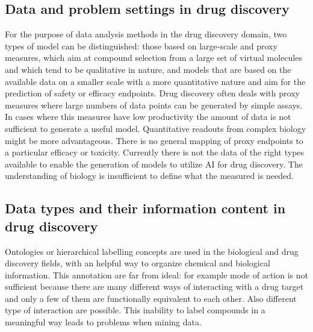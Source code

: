 	\subsection{Data and problem settings in drug discovery}
	For the purpose of data analysis methods in the drug discovery domain, two types of model can be distinguished: those based on large-scale and proxy measures, which aim at compound selection from a large set of virtual molecules and which tend to be qualitative in nature, and models that are based on the available data on a smaller scale with a more quantitative nature and aim for the prediction of safety or efficacy endpoints.
	Drug discovery often deals with proxy measures where large numbers of data points can be generated by simple assays.
	In cases where this measures have low productivity the amount of data is not sufficient to generate a useful model.
	Quantitative readouts from complex biology might be more advantageous.
	There is no general mapping of proxy endpoints to a particular efficacy or toxicity.
	Currently there is not the data of the right types available to enable the generation of models to utilize AI for drug discovery.
	The understanding of biology is insufficient to define what the measured is needed.

	\subsection{Data types and their information content in drug discovery}
	Ontologies or hierarchical labelling concepts are used in the biological and drug discovery fields, with an helpful way to organize chemical and biological information.
	This annotation are far from ideal: for example mode of action is not sufficient because there are many different ways of interacting with a drug target and only a few of them are functionally equivalent to each other.
	Also different type of interaction are possible.
	This inability to label compounds in a meaningful way leads to problems when mining data.
